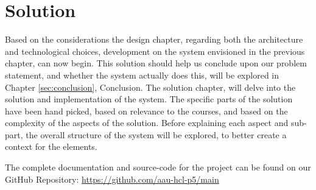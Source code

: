 \chapter{Solution}

Based on the considerations the design chapter, regarding both the architecture and technological choices, development on the system envisioned in the previous chapter, can now begin.
This solution should help us conclude upon our problem statement, and whether the system actually does this, will be explored in Chapter \ref{sec:conclusion}, Conclusion.
The solution chapter, will delve into the solution and implementation of the system.
The specific parts of the solution have been hand picked, based on relevance to the courses, and based on the complexity of the aspects of the solution.
Before explaining each aspect and sub-part, the overall structure of the system will be explored, to better create a context for the elements.

The complete documentation and source-code for the project can be found on our GitHub Repository: \url{https://github.com/aau-hcl-p5/main}


%





